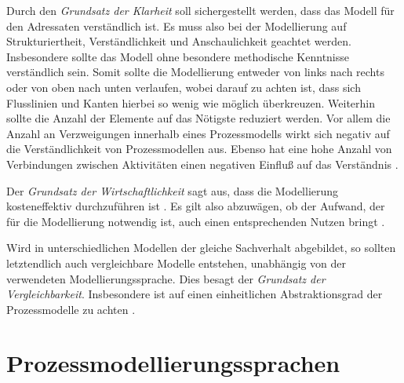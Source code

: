 Durch den \textit{Grundsatz der Klarheit} soll sichergestellt werden, dass das Modell für den Adressaten verständlich ist. Es muss also bei der Modellierung auf Strukturiertheit, Verständlichkeit und Anschaulichkeit geachtet werden. Insbesondere sollte das Modell ohne besondere methodische Kenntnisse verständlich sein. Somit sollte die Modellierung entweder von links nach rechts oder von oben nach unten verlaufen, wobei darauf zu achten ist, dass sich Flusslinien und Kanten hierbei so wenig wie möglich überkreuzen. Weiterhin sollte die Anzahl der Elemente auf das Nötigste reduziert werden. Vor allem die Anzahl an Verzweigungen innerhalb eines Prozessmodells wirkt sich negativ auf die Verständlichkeit von Prozessmodellen aus. Ebenso hat eine hohe Anzahl von Verbindungen zwischen Aktivitäten einen negativen Einfluß auf das Verständnis \cite{leimeister2012,journals95, freund2007,reinshagen2009, becker2012prozessmanagement,koch2011,bpm07,thesis_maja}.\newline

Der \textit{Grundsatz der Wirtschaftlichkeit} sagt aus, dass die Modellierung kosteneffektiv durchzuführen ist \cite{leimeister2012}. Es gilt also abzuwägen, ob der Aufwand, der für die Modellierung notwendig ist, auch einen entsprechenden Nutzen bringt \cite{freund2007, journals95}.\newline

Wird in unterschiedlichen Modellen der gleiche Sachverhalt abgebildet, so sollten letztendlich auch vergleichbare Modelle entstehen, unabhängig von der verwendeten Modellierungssprache. Dies besagt der \textit{Grundsatz der Vergleichbarkeit}. Insbesondere ist auf einen einheitlichen Abstraktionsgrad der Prozessmodelle zu achten \cite{leimeister2012, journals95, freund2007,reinshagen2009}.\newline


\section{Prozessmodellierungssprachen}\label{sec:chapter3:Prozessmodellierungssprachen}

